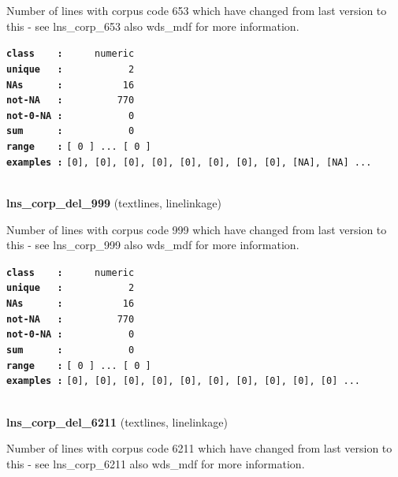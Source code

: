 \documentclass[]{article}
\begin{document}
Number of lines with corpus code 653 which have changed from last
version to this - see lns\_corp\_653 also wds\_mdf for more information.

\textbf{\texttt{class\ \ \ \ :}} \texttt{~~~~~numeric}\\
\textbf{\texttt{unique\ \ \ :}} \texttt{~~~~~~~~~~~2}\\
\textbf{\texttt{NAs\ \ \ \ \ \ :}} \texttt{~~~~~~~~~~16}\\
\textbf{\texttt{not-NA\ \ \ :}} \texttt{~~~~~~~~~770}\\
\textbf{\texttt{not-0-NA\ :}} \texttt{~~~~~~~~~~~0}\\
\textbf{\texttt{sum\ \ \ \ \ \ :}} \texttt{~~~~~~~~~~~0}\\
\textbf{\texttt{range\ \ \ \ :}}
\texttt{{[}\ 0\ {]}\ ...\ {[}\ 0\ {]}}\\
\textbf{\texttt{examples\ :}}
\texttt{{[}0{]},\ {[}0{]},\ {[}0{]},\ {[}0{]},\ {[}0{]},\ {[}0{]},\ {[}0{]},\ {[}0{]},\ {[}NA{]},\ {[}NA{]}\ ...}\\

~

\textbf{lns\_corp\_del\_999} (textlines, linelinkage)

Number of lines with corpus code 999 which have changed from last
version to this - see lns\_corp\_999 also wds\_mdf for more information.

\textbf{\texttt{class\ \ \ \ :}} \texttt{~~~~~numeric}\\
\textbf{\texttt{unique\ \ \ :}} \texttt{~~~~~~~~~~~2}\\
\textbf{\texttt{NAs\ \ \ \ \ \ :}} \texttt{~~~~~~~~~~16}\\
\textbf{\texttt{not-NA\ \ \ :}} \texttt{~~~~~~~~~770}\\
\textbf{\texttt{not-0-NA\ :}} \texttt{~~~~~~~~~~~0}\\
\textbf{\texttt{sum\ \ \ \ \ \ :}} \texttt{~~~~~~~~~~~0}\\
\textbf{\texttt{range\ \ \ \ :}}
\texttt{{[}\ 0\ {]}\ ...\ {[}\ 0\ {]}}\\
\textbf{\texttt{examples\ :}}
\texttt{{[}0{]},\ {[}0{]},\ {[}0{]},\ {[}0{]},\ {[}0{]},\ {[}0{]},\ {[}0{]},\ {[}0{]},\ {[}0{]},\ {[}0{]}\ ...}\\

~

\textbf{lns\_corp\_del\_6211} (textlines, linelinkage)

Number of lines with corpus code 6211 which have changed from last
version to this - see lns\_corp\_6211 also wds\_mdf for more
information.
\end{document}
